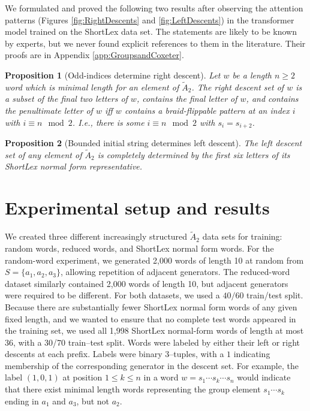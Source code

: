 \documentclass{article}
\newtheorem{proposition}{Proposition}
\begin{document}
We formulated and proved the following two results after observing the attention patterns (Figures \ref{fig:RightDescents} and \ref{fig:LeftDescents}) in the transformer model trained on the ShortLex data set. The statements are likely to be known by experts, but we never found explicit references to them in the literature. Their proofs are in Appendix \ref{app:GroupsandCoxeter}.

\begin{proposition}[Odd-indices determine right descent]\label{prop:OddIndicesDetermineLeftDescent}
Let $w$ be a length $n \geq 2$ word which is minimal length for an element of  $\widetilde{A}_2$. The right descent set of $w$  is a subset of the final two letters of $w$, contains the final letter of $w$, and
contains the penultimate letter of $w$ iff $w$ contains a braid-flippable pattern at an index $i$ with $i \equiv n \mod 2$. I.e., there is some $ i \equiv n \mod 2$ with $s_i = s_{i+2}$.
\end{proposition}

\begin{proposition}[Bounded initial string determines left descent]\label{prop:6LetterEnough}
The left descent set of any element of $\widetilde{A}_2$ is completely determined by the first six letters of its ShortLex normal form representative.
\end{proposition}

\section{Experimental setup and results}

We created three different increasingly structured $\widetilde{A}_2$ data sets for training: random words, reduced words, and ShortLex normal form words. For the random-word experiment, we generated 2,000 words of length 10 at random from $S = \{a_1, a_2, a_3\}$, allowing repetition of adjacent generators. The reduced-word dataset similarly contained 2,000 words of length 10, but adjacent generators were required to be different. For both datasets, we used a $40/60$ train/test split. Because there are substantially fewer ShortLex normal form words of any given fixed length, and we wanted to ensure that no complete test words appeared in the training set, we used all 1,998 ShortLex normal-form words of length at most 36, with a 30/70 train--test split. %
Words were labeled by either their left or right descents at each prefix. Labels were binary $3$--tuples, with a $1$ indicating membership of the corresponding generator in the descent set. For example, the label $(1,0,1)$ at position $1\leq k \leq n$ in a word $w = s_1 \cdots s_k \cdots s_n$ would indicate that there exist minimal length words representing the group element $s_1 \cdots s_k$ ending in $a_1$ and $a_3$, but not $a_2$.
\end{document}
